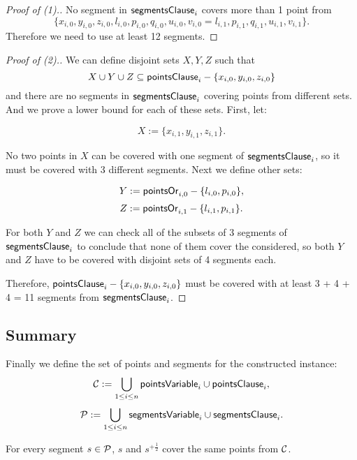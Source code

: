 \begin{proof}[Proof of (1).]
No segment in $\mathsf{segmentsClause}_i$ covers more than 1 point from
$$\{ x_{i, 0}, y_{i, 0}, z_{i, 0}, l_{i, 0}, p_{i, 0}, q_{i, 0},
u_{i, 0}, v_{i, 0} = l_{i, 1}, p_{i, 1}, q_{i, 1}, u_{i, 1}, v_{i, 1} \}.$$
Therefore we need to use at least 12 segments.
\end{proof}

\begin{proof}[Proof of (2).]

We can define disjoint sets $X, Y, Z$ such that
$$X \cup Y \cup Z \subseteq \mathsf{pointsClause}_{i} - \{x_{i, 0}, y_{i, 0}, z_{i, 0}\}$$
and there are no segments in $\mathsf{segmentsClause}_i$ covering points from different sets.
And we prove a lower bound for each of these sets.
First, let:

$$X := \{x_{i, 1}, y_{i, 1}, z_{i, 1}\}.$$

No two points in $X$ can be covered with one segment
of $\mathsf{segmentsClause}_i$, so it must be covered with 3 different segments.
Next we define other sets:

$$Y := \mathsf{pointsOr}_{i,0} - \{l_{i, 0}, p_{i, 0}\},$$
$$Z := \mathsf{pointsOr}_{i,1} - \{l_{i, 1}, p_{i, 1}\}.$$


For both $Y$ and $Z$ we can check all of the subsets of 3 segments
of $\mathsf{segmentsClause}_i$
to conclude that none of them cover the considered,
so both $Y$ and $Z$ have to be covered with 
disjoint sets of 4 segments each.

Therefore, $\mathsf{pointsClause}_{i} - \{x_{i, 0}, y_{i, 0}, z_{i, 0}\}$
must be covered with at least 3 + 4 + 4 = 11 segments from $\mathsf{segmentsClause}_i$.
\end{proof}

\subsection{Summary}



Finally we define the set of points and segments for the constructed instance:
$$\mathcal{C} := \bigcup_{1 \le i \le n} \mathsf{pointsVariable}_{i} \cup \mathsf{pointsClause}_{i},$$
$$\mathcal{P} := \bigcup_{1 \le i \le n} \mathsf{segmentsVariable}_{i} \cup \mathsf{segmentsClause}_i.$$

\begin{lemma}
\label{lemma:exntension_robust}
For every segment $s \in \mathcal{P}$,
$s$ and $s^{+\frac{1}{2}}$ cover the same points from $\mathcal{C}$.
\end{lemma}

